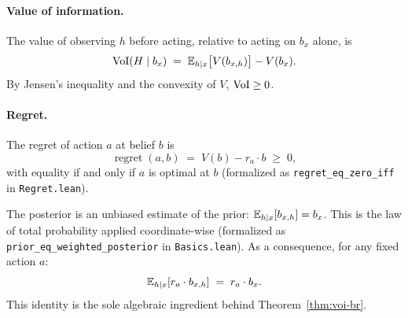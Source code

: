 \paragraph{Value of information.}
The value of observing $h$ before acting, relative to acting on $b_x$ alone, is
\begin{equation}\label{eq:voi-def}
  \operatorname{VoI}(H \mid b_x) \;=\; \mathbb{E}_{h \mid x}\bigl[V(b_{x,h})\bigr] - V(b_x).
\end{equation}
By Jensen's inequality and the convexity of $V$, $\operatorname{VoI} \geq 0$.

\paragraph{Regret.}
The regret of action $a$ at belief $b$ is
\begin{equation}\label{eq:regret-def}
  \operatorname{regret}(a, b) \;=\; V(b) - r_a \cdot b \;\geq\; 0,
\end{equation}
with equality if and only if $a$ is optimal at $b$ (formalized as \texttt{regret\_eq\_zero\_iff} in \texttt{Regret.lean}).

\begin{remark}\label{rem:martingale}
The posterior is an unbiased estimate of the prior: $\mathbb{E}_{h \mid x}[b_{x,h}] = b_x$.
This is the law of total probability applied coordinate-wise (formalized as \texttt{prior\_eq\_weighted\_posterior} in \texttt{Basics.lean}).
As a consequence, for any fixed action $a$:
\begin{equation}\label{eq:martingale}
  \mathbb{E}_{h \mid x}[r_a \cdot b_{x,h}] \;=\; r_a \cdot b_x.
\end{equation}
This identity is the sole algebraic ingredient behind Theorem~\ref{thm:voi-br}.
\end{remark}
